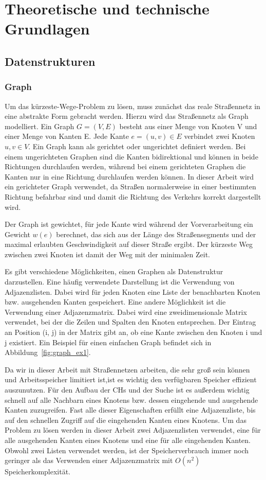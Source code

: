 \section{Theoretische und technische Grundlagen}

\subsection{Datenstrukturen}
\subsubsection{Graph}
Um das kürzeste-Wege-Problem zu lösen, muss zunächst das reale Straßennetz in eine abstrakte Form
gebracht werden. Hierzu wird das Straßennetz als Graph modelliert. Ein Graph $G = (V,E)$ besteht aus
einer Menge von Knoten V und einer Menge von Kanten E. Jede Kante $e = (u,v)\in E$ verbindet zwei
Knoten $u,v \in V$. Ein Graph kann als gerichtet oder ungerichtet definiert werden. Bei einem
ungerichteten  Graphen sind die Kanten bidirektional und können in beide Richtungen durchlaufen
werden, während bei einem gerichteten Graphen die Kanten nur in eine Richtung durchlaufen werden
können. In dieser Arbeit wird ein gerichteter Graph verwendet, da Straßen normalerweise in einer
bestimmten Richtung befahrbar sind und damit die Richtung des
Verkehrs korrekt dargestellt wird.

Der Graph ist gewichtet, \dH für jede Kante wird während der Vorverarbeitung ein Gewicht $w(e)$
berechnet, das sich aus der Länge des Straßensegments und der maximal erlaubten Geschwindigkeit auf
dieser Straße ergibt. Der kürzeste Weg zwischen zwei Knoten ist damit der Weg mit der minimalen Zeit.

Es gibt verschiedene Möglichkeiten, einen Graphen als Datenstruktur darzustellen. Eine häufig
verwendete Darstellung ist die Verwendung von Adjazenzlisten. Dabei wird für jeden Knoten eine Liste
der benachbarten Knoten bzw. ausgehenden Kanten gespeichert. Eine andere Möglichkeit ist die
Verwendung einer Adjazenzmatrix. Dabei wird eine zweidimensionale Matrix verwendet, bei der die
Zeilen und Spalten den Knoten entsprechen. Der Eintrag an Position (i, j) in der Matrix gibt an, ob
eine Kante zwischen den Knoten i und j existiert. Ein Beispiel für einen einfachen Graph befindet
sich in Abbildung~\ref{fig:graph_ex1}.

Da wir in dieser Arbeit mit Straßennetzen arbeiten, die sehr groß sein können und Arbeitsspeicher
limitiert ist,ist es wichtig den verfügbaren Speicher effizient auszunutzen. Für den Aufbau der
\ac{CHs} und der Suche ist es außerdem wichtig schnell auf alle Nachbarn eines Knotens bzw. dessen
eingehende und ausgehende Kanten zuzugreifen. Fast alle dieser Eigenschaften erfüllt eine
Adjazenzliste, bis auf den schnellen Zugriff auf die eingehenden Kanten eines Knotens. Um das
Problem zu lösen werden in dieser Arbeit zwei Adjazenzlisten verwendet, eine für alle ausgehenden
Kanten eines Knotens und eine für alle eingehenden Kanten. Obwohl zwei Listen verwendet werden, ist
der Speicherverbrauch immer noch geringer als das Verwenden einer Adjazenzmatrix mit $O(n^2)$
Speicherkomplexität.


